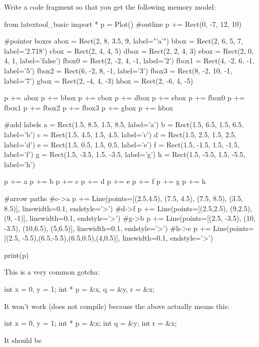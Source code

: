 \begin{ex}
Write a code fragment so that you get the following memory model:

\begin{python}
from latextool_basic import *
p = Plot()
#outline
p += Rect(0, -7, 12, 10)

#pointer boxes
abox = Rect(2, 8, 3.5, 9, label="'a'")
bbox = Rect(2, 6, 5, 7, label='2.718')
cbox = Rect(2, 4, 4, 5)
dbox = Rect(2, 2, 4, 3)
ebox = Rect(2, 0, 4, 1, label='false')
fbox0 = Rect(2, -2, 4, -1, label='2')
fbox1 = Rect(4, -2, 6, -1, label='5')
fbox2 = Rect(6, -2, 8, -1, label='3')
fbox3 = Rect(8, -2, 10, -1, label='7')
gbox = Rect(2, -4, 4, -3)
hbox = Rect(2, -6, 4, -5)

p += abox
p += bbox
p += cbox
p += dbox
p += ebox
p += fbox0
p += fbox1
p += fbox2
p += fbox3
p += gbox
p += hbox

#add labels
a = Rect(1.5, 8.5, 1.5, 8.5, label='a')
b = Rect(1.5, 6.5, 1.5, 6.5, label='b')
c = Rect(1.5, 4.5, 1.5, 4.5, label='c')
d = Rect(1.5, 2.5, 1.5, 2.5, label='d')
e = Rect(1.5, 0.5, 1.5, 0.5, label='e')
f = Rect(1.5, -1.5, 1.5, -1.5, label='f')
g = Rect(1.5, -3.5, 1.5, -3.5, label='g')
h = Rect(1.5, -5.5, 1.5, -5.5, label='h')

p += a
p += b
p += c
p += d
p += e
p += f
p += g
p += h

#arrow paths
#c->a
p += Line(points=[(2.5,4.5), (7.5, 4.5), (7.5, 8.5), (3.5, 8.5)], linewidth=0.1, endstyle='>')
#d->f
p += Line(points=[(2.5,2.5), (9,2.5), (9, -1)], linewidth=0.1, endstyle='>')
#g->b
p += Line(points=[(2.5, -3.5), (10, -3.5), (10,6.5), (5,6.5)], linewidth=0.1, endstyle='>')
#h->e
p += Line(points=[(2.5, -5.5),(6.5,-5.5),(6.5,0.5),(4,0.5)], linewidth=0.1, endstyle='>')

print(p)
\end{python}

\end{ex}

\newpage{}

This is a very common gotcha:

\begin{consolethree}[escapeinside=||]
int x = 0, y = 1;
int * p = &x, q = &y, r = &x;
\end{consolethree}
It won't work (does not compile) because the above actually means this:

\begin{consolethree}[escapeinside=||]
int x = 0, y = 1;
int * p = \&x;
int q = \&y;
int r = \&x;
\end{consolethree}
It should be

